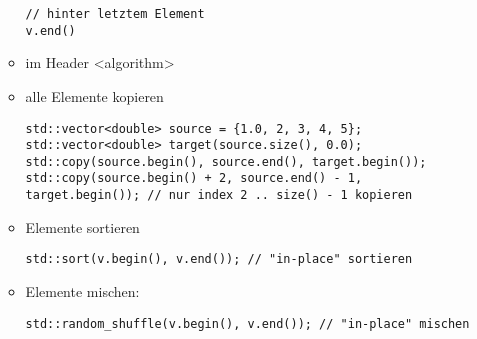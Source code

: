 \documentclass[a4paper]{scrartcl}
\begin{document}
\begin{itemize}
\begin{itemize}
\begin{verbatim}
// hinter letztem Element
v.end()
\end{verbatim}
\item im Header <algorithm>
\item alle Elemente kopieren
\begin{verbatim}
std::vector<double> source = {1.0, 2, 3, 4, 5};
std::vector<double> target(source.size(), 0.0);
std::copy(source.begin(), source.end(), target.begin());
std::copy(source.begin() + 2, source.end() - 1, target.begin()); // nur index 2 .. size() - 1 kopieren
\end{verbatim}
\item Elemente sortieren
\begin{verbatim}
std::sort(v.begin(), v.end()); // "in-place" sortieren
\end{verbatim}
\item Elemente mischen:
\begin{verbatim}
std::random_shuffle(v.begin(), v.end()); // "in-place" mischen
\end{verbatim}
\end{itemize}
\end{itemize}
\end{document}
